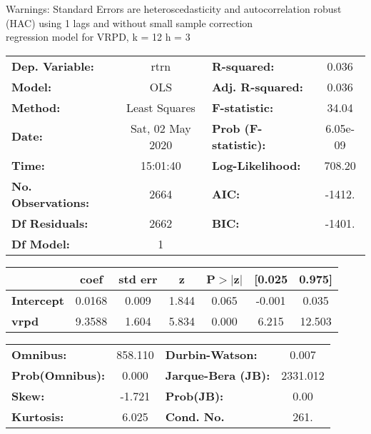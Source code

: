 Warnings: \newline
 [1] Standard Errors are heteroscedasticity and autocorrelation robust (HAC) using 1 lags and without small sample correction\\ 

regression model for VRPD, k = 12 h = 3\begin{center}
\begin{tabular}{lclc}
\toprule
\textbf{Dep. Variable:}    &       rtrn       & \textbf{  R-squared:         } &     0.036   \\
\textbf{Model:}            &       OLS        & \textbf{  Adj. R-squared:    } &     0.036   \\
\textbf{Method:}           &  Least Squares   & \textbf{  F-statistic:       } &     34.04   \\
\textbf{Date:}             & Sat, 02 May 2020 & \textbf{  Prob (F-statistic):} &  6.05e-09   \\
\textbf{Time:}             &     15:01:40     & \textbf{  Log-Likelihood:    } &    708.20   \\
\textbf{No. Observations:} &        2664      & \textbf{  AIC:               } &    -1412.   \\
\textbf{Df Residuals:}     &        2662      & \textbf{  BIC:               } &    -1401.   \\
\textbf{Df Model:}         &           1      & \textbf{                     } &             \\
\bottomrule
\end{tabular}
\begin{tabular}{lcccccc}
                   & \textbf{coef} & \textbf{std err} & \textbf{z} & \textbf{P$> |$z$|$} & \textbf{[0.025} & \textbf{0.975]}  \\
\midrule
\textbf{Intercept} &       0.0168  &        0.009     &     1.844  &         0.065        &       -0.001    &        0.035     \\
\textbf{vrpd}      &       9.3588  &        1.604     &     5.834  &         0.000        &        6.215    &       12.503     \\
\bottomrule
\end{tabular}
\begin{tabular}{lclc}
\textbf{Omnibus:}       & 858.110 & \textbf{  Durbin-Watson:     } &    0.007  \\
\textbf{Prob(Omnibus):} &   0.000 & \textbf{  Jarque-Bera (JB):  } & 2331.012  \\
\textbf{Skew:}          &  -1.721 & \textbf{  Prob(JB):          } &     0.00  \\
\textbf{Kurtosis:}      &   6.025 & \textbf{  Cond. No.          } &     261.  \\
\bottomrule
\end{tabular}
\end{center}

